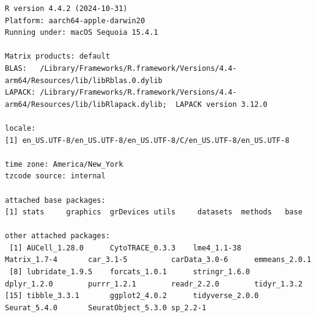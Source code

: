 \documentclass[
  landscape]{article}
\begin{document}
\begin{verbatim}
R version 4.4.2 (2024-10-31)
Platform: aarch64-apple-darwin20
Running under: macOS Sequoia 15.4.1

Matrix products: default
BLAS:   /Library/Frameworks/R.framework/Versions/4.4-arm64/Resources/lib/libRblas.0.dylib 
LAPACK: /Library/Frameworks/R.framework/Versions/4.4-arm64/Resources/lib/libRlapack.dylib;  LAPACK version 3.12.0

locale:
[1] en_US.UTF-8/en_US.UTF-8/en_US.UTF-8/C/en_US.UTF-8/en_US.UTF-8

time zone: America/New_York
tzcode source: internal

attached base packages:
[1] stats     graphics  grDevices utils     datasets  methods   base     

other attached packages:
 [1] AUCell_1.28.0      CytoTRACE_0.3.3    lme4_1.1-38        Matrix_1.7-4       car_3.1-5          carData_3.0-6      emmeans_2.0.1     
 [8] lubridate_1.9.5    forcats_1.0.1      stringr_1.6.0      dplyr_1.2.0        purrr_1.2.1        readr_2.2.0        tidyr_1.3.2       
[15] tibble_3.3.1       ggplot2_4.0.2      tidyverse_2.0.0    Seurat_5.4.0       SeuratObject_5.3.0 sp_2.2-1          


\end{verbatim}
\end{document}
